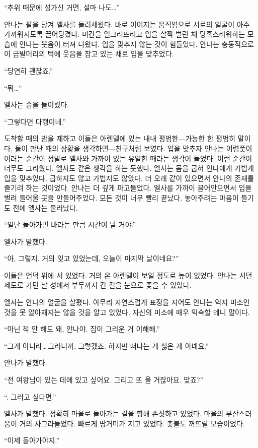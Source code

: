 ``추위 때문에 성가신 거면, 설마 나도\ldots''

안나는 팔을 당겨 엘사를 돌려세웠다. 바로 이어지는 움직임으로 서로의 얼굴이 아주 가까워지도록 끌어당겼다. 미간을 일그러뜨리고 입을 살짝 벌린 채 당혹스러워하는 모습에 안나는 웃음이 터져 나왔다. 입을 맞추지 않는 것이 힘들었다. 안나는 충동적으로 이 금발머리의 턱에 웃음을 참고 있는 채로 입을 맞추었다.

``당연히 괜찮죠.''

``뭐\ldots''

엘사는 숨을 들이켰다.

``그렇다면 다행이네.''

도착할 때의 밤을 제하고 이들은 아렌델에 있는 내내 평범한—가능한 한 평범히 말이다, 둘이 만난 때의 상황을 생각하면—친구처럼 보였다. 입을 맞추자 안나는 어렴풋이 이러는 순간이 정말로 엘사와 가까이 있는 유일한 때라는 생각이 들었다. 이런 순간이 너무도 그리웠다. 엘사도 같은 생각을 하는 듯했다. 엘사는 몸을 굽혀 안나에게 가볍게 입을 맞추었다. 급하지도 않고 가볍지도 않았다. 더 오래 같이 있으면서 안나의 존재를 즐기려 하는 것이었다. 안나는 더 깊게 파고들었다. 엘사를 가까이 끌어안으면서 입을 벌려 들어올 곳을 만들어주었다. 모든 것이 너무 빨리 끝났다. 놓아주려는 마음이 들기도 전에 엘사는 물러났다.

``일단 돌아가면 바라는 만큼 시간이 날 거야.''

엘사가 말했다.

``아, 그렇지. 거의 잊고 있었는데, 오늘이 마지막 날이네요?''

이들은 언덕 위에 서 있었다. 거의 온 아렌델이 보일 정도로 높이 있었다. 안나는 서던 제도로 가던 날 성에서 부두까지 간 길을 눈으로 좇을 수 있었다.

엘사는 안나의 얼굴을 살폈다. 아무리 자연스럽게 표정을 지어도 안나는 억지 미소인 것을 못 알아채지는 않을 것을 알고 있었다. 자신의 미소에 매우 익숙할 테니 말이다.

``아닌 척 안 해도 돼, 안나야. 집이 그리운 거 이해해.''

``그게 아니라\ldots\,그러니까, 그렇겠죠. 하지만 떠나는 게 싫은 게 아녜요.''

안나가 말했다.

``전 여왕님이 있는 데에 있고 싶어요. 그리고 또 올 거잖아요. 맞죠?''

``. 그러고 싶다면.''

엘사가 말했다. 정확히 마을로 돌아가는 길을 향해 손짓하고 있었다. 마을의 부산스러움이 거의 사그라들었다. 빠르게 땅거미가 지고 있었다. 촛불도 꺼뜨릴 모습이었다.

``이제 돌아가야지.''

